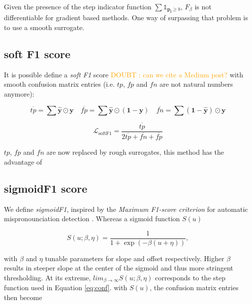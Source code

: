 \documentclass[sigconf,natbib,screen=true,review=true,anonymous]{acmart}
\newcommand\doubt[1]{\textcolor{orange}{DOUBT : #1}}
\begin{document}
Given the presence of the step indicator function \(\sum \mathds{1}_{\mathbf{p_i} \geq b}\), \(F_\beta\) is not differentiable for gradient based methods. One way of surpassing that problem is to use a smooth surrogate.

\subsection{soft F1 score}
\label{sec:org0812624}

It is possible define a \emph{soft F1} score \cite{softF1} \doubt{can we cite a Medium post?} with smooth confusion matrix entries (i.e. \(tp\), \(fp\) and \(fn\) are not natural numbers anymore):

$$
\overline{tp}=\sum \hat{\mathbf{y}} \odot \mathbf{y} \quad \overline{fp} = \sum \hat{\mathbf{y}} \odot (\mathbf{1}- \mathbf{y}) \quad \overline{fn} = \sum (\mathbf{1} - \hat{\mathbf{y}}) \odot \mathbf{y}
$$

\begin{equation}
\mathcal{L}_{\text {softF1}}= \frac{\overline{tp}}{2 \overline{tp}+ \overline{fn}+ \overline{fp}}
\end{equation}

\(tp\), \(fp\) and \(fn\) are now replaced by rough surrogates, this method has the advantage of 


\subsection{sigmoidF1 score}
\label{sec:orge6669d1}

We define \emph{sigmoidF1}, inspired by the \emph{Maximum F1-score criterion} for automatic mispronounciation detection \cite{sigmoid}. Whereas a sigmoid function \(S(u)\)

\begin{equation}
S(u; \beta, \eta)=\frac{1}{1+\exp (-\beta (u + \eta))},
\end{equation}

with \(\beta\) and \(\eta\) tunable parameters for slope and offset respectively. Higher \(\beta\) results in steeper slope at the center of the sigmoid and thus more stringent thresholding. At its extreme, \(lim_{\beta\to\infty} S(u; \beta, \eta)\) corresponds to the step function used in Equation \ref{eq:conf}. with \(S(u)\), the confusion matrix entries then become
\end{document}
